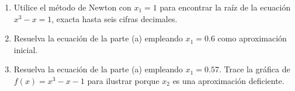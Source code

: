 \item \par
\begin{enumerate}
    \item[(a)] Utilice el método de Newton con $x_1 = 1$ para encontrar la raíz de la ecuación $x^3 - x = 1$, exacta hasta seis cifras decimales.
    \item[(b)] Resuelva la ecuación de la parte (a) empleando $x_1 = 0.6$ como aproximación inicial.
    \item[(c)] Resuelva la ecuación de la parte (a) empleando $x_1 = 0.57$. Trace la gráfica de $f(x) = x^3 - x - 1$ para ilustrar porque $x_2$ es una aproximación deficiente.
\end{enumerate}
